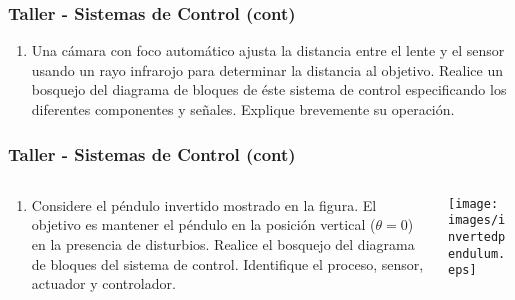 \documentclass[aspectratio=169,handout]{beamer}
\theoremstyle{definition}
\theoremstyle{plain}
\theoremstyle{remark}
\newcounter{saveenumi}
\newcommand{\seti}{\setcounter{saveenumi}{\value{enumi}}}
\newcommand{\conti}{\setcounter{enumi}{\value{saveenumi}}}
\begin{document}
\begin{frame}[c]\frametitle{Taller - Sistemas de Control (cont)}
\begin{enumerate}
  \conti
  \item Una cámara con foco automático ajusta la distancia entre el lente y el sensor usando un rayo infrarojo para determinar la distancia al objetivo. Realice un bosquejo del diagrama de bloques de éste sistema de control especificando los diferentes componentes y señales. Explique brevemente su operación.
  \seti
\end{enumerate}
\end{frame}

\begin{frame}[c]\frametitle{Taller - Sistemas de Control (cont)}
\begin{columns}
  \begin{column}{0.5\textwidth}
    \begin{enumerate}
      \conti
      \item Considere el péndulo invertido mostrado en la figura. El objetivo es mantener el péndulo en la posición vertical ($\theta = 0$) en la presencia de disturbios. Realice el bosquejo del diagrama de bloques del sistema de control. Identifique el proceso, sensor, actuador y controlador.
    \end{enumerate}
  \end{column} 
  \begin{column}{0.5\textwidth}
   \centering
   \texttt{[image: images/invertedpendulum.eps]}
  \end{column} 
\end{columns}
\end{frame}
\end{document}
